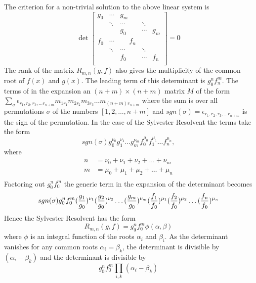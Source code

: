 The criterion for a non-trivial solution to the above linear system is 
\[
\det \begin{bmatrix}
g_0 & \cdots & g_m & & \\
&\ddots & \cdots & \ddots & \\
& & g_0 & \cdots & g_m \\
f_0 & \cdots & ~~~~~~f_n & & \\
&\ddots & \cdots & \ddots & \\
& &f_0 & \cdots &f_n \\
\end{bmatrix} = 0\]
The rank of the matrix $R_{m,n}(g,f)$ also gives the multiplicity of the common root of $f(x)$ and $g(x)$.
The leading term of this determinant is $g_0^n f_n^m$. The terms of in the expansion an $(n + m) \times (n+m)$ matrix $M$  of the form
$\sum_{\sigma}\epsilon_{r_1,r_2,r_3,\hdots r_{n+m}} m_{1r_1} m_{2r_2} m_{3r_3}  \hdots m_{(n+m) r_{n+m}} $ where the sum is over all permutations $\sigma$ of the numbers $[1,2,\hdots,n+m]$ and 
$sgn(\sigma) = \epsilon_{r_1,r_2,r_3,\hdots r_{n+m}} $ is the sign of the permutation. In the case of the Sylvester Resolvent the terms take the form 
\[sgn(\sigma) g_0^{\nu_0}g_1^{\nu_1}\hdots g_m^{\nu_m} f_0^{\mu_0} f_1^{\mu_1} \hdots f_n^{\mu_n},\]
where 
\begin{align*}
n &=  \nu_0 + \nu_1   +   \nu_2 + \hdots  + \nu_m \\ 
m & =  \mu_0 + \mu_1  +  \mu_2 + \hdots  + \mu_n \\
\end{align*}
Factoring out $g_0^n f_0^m$ the generic term in the expansion of the determinant becomes
\[sgn(\sigma) g_0^n f_0^m  ( {g_1\over g_0})^{\nu_1} ({g_2\over g_0})^{\nu_2} \hdots ({g_m \over g_0})^{\nu_m}  ({f_1\over f_0})^{\mu_1} ({f_2\over f_0})^{\mu_2} \hdots ({f_n\over f_0})^{\mu_n} \]
Hence the Sylvester Resolvent has the form 
\[ R_{m,n}(g,f) = g_0^n f_0^m \phi(\alpha,\beta) \] where $\phi$ is an integral function of the roots $\alpha_i$ and $\beta_i$.
As the determinant vanishes for any common roots $\alpha_i = \beta_k$, the determinant is divisible by $(\alpha_i - \beta_k)$ and the determinant is divisible by 
\[ g_0^n f_0^m \prod_{i,k} (\alpha_i - \beta_k) \]

